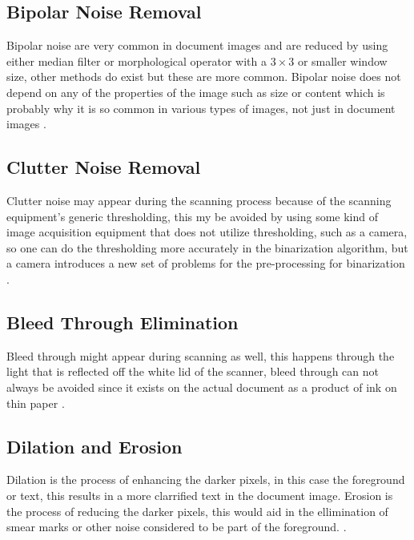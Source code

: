 \documentclass[11pt]{article}
\begin{document}
		\subsection{Bipolar Noise Removal}
			Bipolar noise are very common in document images and are reduced by using either median filter or morphological operator with a $3\times 3$ or smaller window size, other methods do exist but these are more common. Bipolar noise does not depend on any of the properties of the image such as size or content which is probably why it is so common in various types of images, not just in document images \cite{agrawal2011stroke}.

		\subsection{Clutter Noise Removal}
			Clutter noise may appear during the scanning process because of the scanning equipment's generic thresholding, this my be avoided by using some kind of image acquisition equipment that does not utilize thresholding, such as a camera, so one can do the thresholding more accurately in the binarization algorithm, but a camera introduces a new set of problems for the pre-processing for binarization \cite{agrawal2011stroke}.\\

		\subsection{Bleed Through Elimination}
			Bleed through might appear during scanning as well, this happens through the light that is reflected off the white lid of the scanner, bleed through can not always be avoided since it exists on the actual document as a product of ink on thin paper \cite{agrawal2011stroke}.\\

		\subsection{Dilation and Erosion}
			Dilation is the process of enhancing the darker pixels, in this case the foreground or text, this results in a more clarrified text in the document image. Erosion is the process of reducing the darker pixels, this would aid in the ellimination of smear marks or other noise considered to be part of the foreground. \cite{ntogas2008binarization}.

\end{document}
